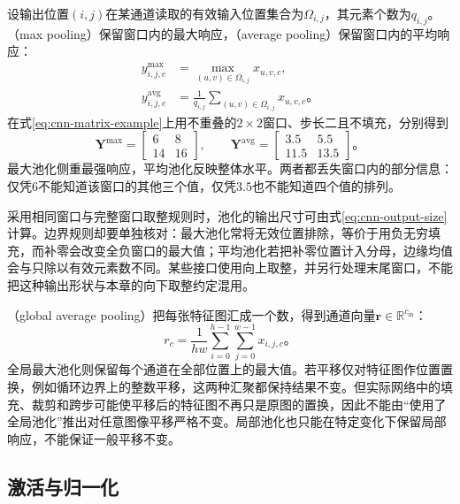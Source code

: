 设输出位置$(i,j)$在某通道读取的有效输入位置集合为$\Omega_{i,j}$，其元素个数为$q_{i,j}$。（max pooling）保留窗口内的最大响应，（average pooling）保留窗口内的平均响应：
\begin{equation}
  \begin{aligned}
    y_{i,j,c}^{\mathrm{max}}&=\max_{(u,v)\in\Omega_{i,j}}x_{u,v,c},\\
    y_{i,j,c}^{\mathrm{avg}}&=\frac1{q_{i,j}}
                   \sum_{(u,v)\in\Omega_{i,j}}x_{u,v,c}\text{。}
  \end{aligned}
  \label{eq:cnn-local-pooling}
\end{equation}
在式\eqref{eq:cnn-matrix-example}上用不重叠的$2\times2$窗口、步长二且不填充，分别得到
\begin{equation}
  \bm Y^{\mathrm{max}}=\begin{bmatrix}6&8\\14&16\end{bmatrix},\qquad
  \bm Y^{\mathrm{avg}}=\begin{bmatrix}3.5&5.5\\11.5&13.5\end{bmatrix}\text{。}
  \label{eq:cnn-pooling-example}
\end{equation}
最大池化侧重最强响应，平均池化反映整体水平。两者都丢失窗口内的部分信息：仅凭$6$不能知道该窗口的其他三个值，仅凭$3.5$也不能知道四个值的排列。

采用相同窗口与完整窗口取整规则时，池化的输出尺寸可由式\eqref{eq:cnn-output-size}计算。边界规则却要单独核对：最大池化常将无效位置排除，等价于用负无穷填充，而补零会改变全负窗口的最大值；平均池化若把补零位置计入分母，边缘均值会与只除以有效元素数不同。某些接口使用向上取整，并另行处理末尾窗口，不能把这种输出形状与本章的向下取整约定混用。

（global average pooling）把每张特征图汇成一个数，得到通道向量$\bm r\in\mathbb R^{c_{\mathrm{in}}}$：
\begin{equation}
  r_c=\frac1{hw}\sum_{i=0}^{h-1}\sum_{j=0}^{w-1}x_{i,j,c}\text{。}
  \label{eq:cnn-global-average-pooling}
\end{equation}
全局最大池化则保留每个通道在全部位置上的最大值。若平移仅对特征图作位置置换，例如循环边界上的整数平移，这两种汇聚都保持结果不变。但实际网络中的填充、裁剪和跨步可能使平移后的特征图不再只是原图的置换，因此不能由“使用了全局池化”推出对任意图像平移严格不变。局部池化也只能在特定变化下保留局部响应，不能保证一般平移不变。

\subsection{激活与归一化}
\label{sec:cnn-activation-normalization}

